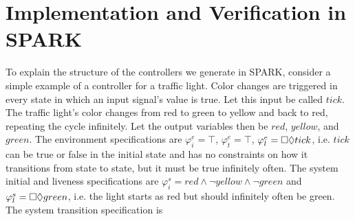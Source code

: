\documentclass[runningheads]{llncs}
\begin{document}
\section{Implementation and Verification in SPARK}
\label{sec:implementation}

To explain the structure of the controllers we generate in SPARK, consider a simple example of a controller for a traffic light. 
Color changes are triggered in every state in which an input signal's value is true.
Let this input be called $tick$.
The traffic light's color changes from red to green to yellow and back to red, repeating the cycle infinitely. 
Let the output variables then be $red$, $yellow$, and $green$.
The environment specifications are $\varphi^e_i = \top$, $\varphi^e_t = \top$, $\varphi^e_l = \square \lozenge tick$, i.e.  
$tick$ can be true or false in the initial state and has no constraints on how it transitions from state to state, but it must be true infinitely often.
The system initial and liveness specifications are $\varphi^s_i = red \land \lnot yellow \land \lnot green$ and $\varphi^s_l =  \square \lozenge green$, i.e.
the light starts as red but should infinitely often be green. The system transition specification is
\end{document}
